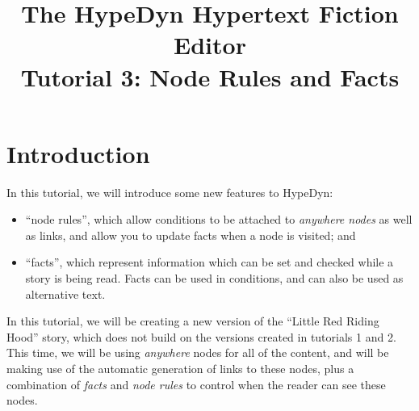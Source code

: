 \documentclass{article}
\begin{document}
\title{The HypeDyn Hypertext Fiction Editor\\Tutorial 3: Node Rules and Facts}
\date{}

\onecolumn
\maketitle

\tableofcontents


\section{Introduction}
In this tutorial, we will introduce some new features to HypeDyn:

\begin{itemize}
  \item ``node rules'', which allow conditions to be attached to
  \textit{anywhere nodes} as well as links, and allow you to update facts when a
  node is visited; and
  \item ``facts'', which represent information which can be set and checked
  while a story is being read. Facts can be used in conditions, and can also be
  used as alternative text.
\end{itemize}



In this tutorial, we will be creating a new version of the ``Little Red
Riding Hood'' story, which does not build on the versions created in tutorials
1 and 2. This time, we will be using \textit{anywhere} nodes for all of the
content, and will be making use of the automatic generation of links to these
nodes, plus a combination of \textit{facts} and \textit{node rules} to control
when the reader can see these nodes.
\end{document}
